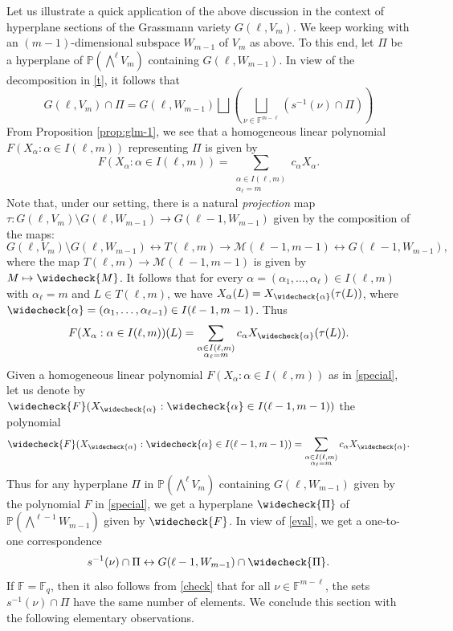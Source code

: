\documentclass[10pt,a4paper,oneside]{amsproc}
\newcommand{\Fq}{\mathbb{F}_q}
\newcommand{\M}{\mathcal{M}}
\def\a{{\alpha}}
\def\Fq{{\mathbb F}_q}
\def\FF{{\mathbb F}}
\def\PP{{\mathbb P}}
\begin{document}
Let us illustrate a quick application of the above discussion in the context of hyperplane sections of the Grassmann variety $G(\ell, V_m)$. We keep working with an $(m-1)$-dimensional subspace $W_{m-1}$ of $V_m$ as above. To this end, let $\Pi$ be a hyperplane of $\PP(\bigwedge^\ell V_m)$ containing $G(\ell, W_{m-1})$. In view of the decomposition in \eqref{t}, it follows that
\begin{equation}\label{section}
    G(\ell, V_m) \cap \Pi = G(\ell, W_{m-1}) \bigsqcup \left( \bigsqcup_{\nu \in \FF^{m-\ell}} \left(s^{-1} (\nu) \cap \Pi\right)\right)
\end{equation}
From Proposition \ref{prop:glm-1}, we see that a homogeneous linear polynomial $F(X_\a : \a \in I(\ell, m))$ representing $\Pi$ is given by 
\begin{equation}\label{special}
F(X_\a : \a \in I(\ell, m)) = \sum_{\substack{\a \in I(\ell, m) \\ \a_\ell = m}} c_\a X_\a.
\end{equation}
Note that, under our setting, there is a natural \textit{projection} map
$\tau : G(\ell, V_m) \setminus G(\ell, W_{m-1}) \to G(\ell - 1, W_{m-1})$ given by the composition of the maps:
$$G(\ell, V_m) \setminus G(\ell, W_{m-1}) \longleftrightarrow T(\ell, m) \to \M(\ell - 1, m-1) \longleftrightarrow G(\ell - 1, W_{m-1}),$$
where the map $T(\ell, m) \to \M(\ell - 1, m-1)$ is given by $M \mapsto \widecheck{M}$. It follows that for every $\a = (\a_1, \dots, \a_\ell) \in I(\ell, m)$ with $\a_\ell = m$ and $L \in T(\ell, m)$, we have $X_\a (L) = X_{\widecheck{\a}} (\tau (L))$, where $\widecheck{\alpha} = (\a_1, \dots, \a_{\ell - 1}) \in I(\ell - 1, m-1)$. 
Thus
\begin{equation}\label{eval}
F(X_\a : \a \in I(\ell, m)) (L) = \sum_{\substack{\a \in I(\ell, m) \\ \a_\ell = m}} c_\a X_{\widecheck{\a}}(\tau(L)).
\end{equation}
Given a homogeneous linear polynomial $F(X_\a : \a \in I(\ell, m))$ as in \eqref{special}, let us denote by $\widecheck{F} (X_{\widecheck{\a}} : {\widecheck{\a}} \in I(\ell-1, m-1))$ the polynomial
$$\widecheck{F} (X_{\widecheck{\a}} : {\widecheck{\a}} \in I(\ell-1, m-1)) = \sum_{\substack{\a \in I(\ell, m) \\ \a_\ell = m}} c_\a X_{\widecheck{\a}}.$$
Thus for any hyperplane $\Pi$  in $\PP (\bigwedge^{\ell} V_m)$ containing $G(\ell, W_{m-1})$ given by the polynomial $F$ in \eqref{special}, we get a hyperplane $\widecheck{\Pi}$ of $\PP (\bigwedge^{\ell - 1} W_{m-1})$ given by $\widecheck{F}$. In view of \eqref{eval}, we get a one-to-one correspondence
\begin{equation}\label{check}
s^{-1} (\nu) \cap \Pi \leftrightarrow G(\ell - 1, W_{m-1}) \cap \widecheck{\Pi}.
\end{equation}
If $\FF = \Fq$, then it also follows from \eqref{check} that for all $\nu \in \FF^{m-\ell}$, the sets $s^{-1} (\nu) \cap \Pi$ have the same number of elements.  
We conclude this section with the following elementary observations. 
\end{document}
